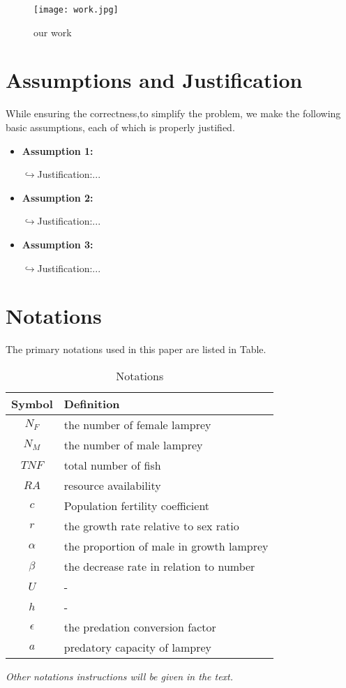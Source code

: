\documentclass[12pt]{article}  %
\begin{document}
\begin{figure}[htbp]
	\centering
	\texttt{[image: work.jpg]}
	\caption{our work}\label{fig:work}
\end{figure}


\section{Assumptions and Justification}
 While ensuring the correctness,to simplify the problem, we make the following basic assumptions, each of which is properly justified.

\begin{itemize}
	\item \textbf{Assumption 1:}
	
	$\hookrightarrow$Justification:...\cite{1}
	\item \textbf{Assumption 2:}
	
	$\hookrightarrow$Justification:...\cite{2}
	\item \textbf{Assumption 3:}
	
	$\hookrightarrow$Justification:...\cite{3}
\end{itemize}


\section{Notations}
The primary notations used in this paper are listed in Table.

\begin{table}[!htbp]
\begin{center}
\begin{threeparttable}
\caption{Notations}
\begin{tabular}{cl}
	\toprule
	\multicolumn{1}{m{3cm}}{\centering Symbol}
	&\multicolumn{1}{m{12cm}}{\centering Definition}\\
	\midrule
	$N_{F}$&the number of female lamprey\\
	$N_{M}$&the number of male lamprey\\
	$TNF$ &total number of fish\\
	$RA$&resource availability\\
	$c$&Population fertility coefficient\\
	$r$ &the growth rate relative to sex ratio\\
	$\alpha$ &the proportion of male in growth lamprey\\
	$\beta$ &the decrease rate in relation to number\\
	$U$&-\\
	$h$&-\\
	$\epsilon$&the predation conversion factor\\
	$a$&predatory capacity of lamprey\\
	

	\bottomrule

\end{tabular}\label{tb:001}
\small
\textit{Other notations instructions will be given in the text.}
\end{threeparttable}
\end{center}
\end{table}
\end{document}
